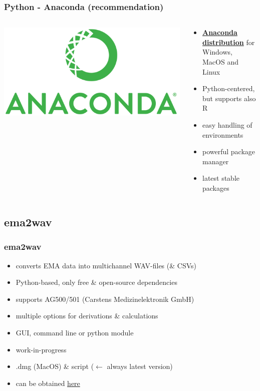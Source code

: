 \documentclass[12pt,a4paper]{beamer}
\begin{document}
\begin{frame}
    \frametitle{Python - Anaconda (recommendation)}
    \begin{columns}
        \begin{column}{.5\textwidth}
            \includegraphics[scale=0.5]{../pictures/anaconda_logo.png}
        \end{column}
        \begin{column}{.5\textwidth}
            \begin{itemize}
                \item \href{https://www.anaconda.com/products/distribution}{\textbf{Anaconda distribution}} for Windows, MacOS and Linux
                \item Python-centered, but supports also R
                \item easy handling of environments
                \item powerful package manager
                \item latest stable packages
            \end{itemize}
        \end{column}
    \end{columns}
    

\end{frame}


\subsection{ema2wav}
\begin{frame}
    \frametitle{ema2wav}
    \begin{itemize}
        \item converts EMA data into multichannel WAV-files (\& CSVs)
        \item Python-based, only free \& open-source dependencies
        \item supports AG500/501 (Carstens Medizinelektronik GmbH)
        \item multiple options for derivations \& calculations
        \item GUI, command line or python module
        \item work-in-progress
        \item .dmg (MacOS) \& script ($\leftarrow$ always latest version)
        \item can be obtained \href{https://github.com/phbuech/ema2wav}{here}
    \end{itemize}
\end{frame}
\end{document}
